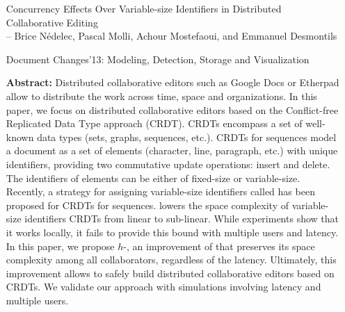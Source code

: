 \begin{itemize}
\item [Concurrency Effects Over Variable-size Identifiers in Distributed 
  Collaborative Editing] \ \\
  -- Brice Nédelec, Pascal Molli, Achour Mostefaoui, and Emmanuel Desmontils
\item [Document Changes'13: Modeling, Detection, Storage and Visualization]
\item [\textbf{Abstract:}] {\small Distributed collaborative editors such as
    Google Docs or Etherpad allow to distribute the work across time, space and
    organizations. In this paper, we focus on distributed collaborative editors
    based on the Conflict-free Replicated Data Type approach (CRDT). CRDTs
    encompass a set of well-known data types (sets, graphs, sequences,
    etc.). CRDTs for sequences model a document as a set of elements (character,
    line, paragraph, etc.) with unique identifiers, providing two commutative
    update operations: insert and delete. The identifiers of elements can be
    either of fixed-size or variable-size. Recently, a strategy for assigning
    variable-size identifiers called \LSEQ has been proposed for CRDTs for
    sequences. \LSEQ lowers the space complexity of variable-size identifiers
    CRDTs from linear to sub-linear. While experiments show that it works
    locally, it fails to provide this bound with multiple users and latency. In
    this paper, we propose $h$-\LSEQ, an improvement of \LSEQ that preserves its
    space complexity among all collaborators, regardless of the
    latency. Ultimately, this improvement allows to safely build distributed
    collaborative editors based on CRDTs. We validate our approach with
    simulations involving latency and multiple users.}
\end{itemize}